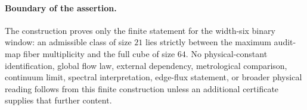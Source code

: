 \paragraph{Boundary of the assertion.}
The construction proves only the finite statement for the width-six binary window: an admissible class of size $21$ lies strictly between the maximum audit-map fiber multiplicity and the full cube of size $64$.  No physical-constant identification, global flow law, external dependency, metrological comparison, continuum limit, spectral interpretation, edge-flux statement, or broader physical reading follows from this finite construction unless an additional certificate supplies that further content.
